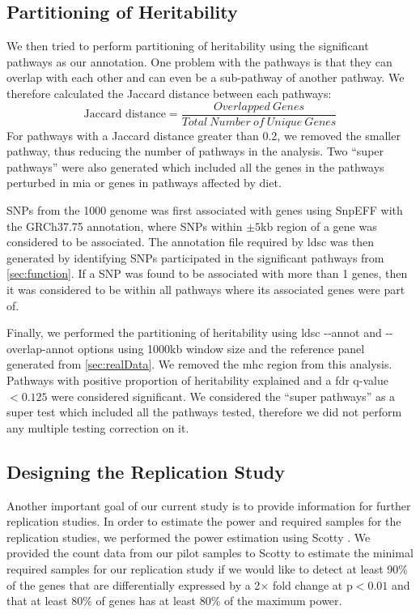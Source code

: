 \documentclass[12pt]{scrbook}
\begin{document}
\subsection{Partitioning of Heritability}
We then tried to perform partitioning of heritability using the significant pathways as our annotation.
One problem with the pathways is that they can overlap with each other and can even be a sub-pathway of another pathway.
We therefore calculated the Jaccard distance between each pathways:
\begin{equation}
\text{Jaccard distance} = \frac{Overlapped\ Genes}{Total\ Number\ of\ Unique\ Genes}
\end{equation}
For pathways with a Jaccard distance greater than 0.2, we removed the smaller pathway, thus reducing the number of pathways in the analysis.
Two ``super pathways'' were also generated which included all the genes in the pathways perturbed in \gls{mia} or genes in pathways affected by diet. 

\glspl{SNP} from the 1000 genome was first associated with genes using SnpEFF \citep{Cingolani2012} with the GRCh37.75 annotation, where \glspl{SNP} within $\pm5$\gls{kb} region of a gene was considered to be associated.
The annotation file required by \gls{ldsc} was then generated by identifying \glspl{SNP} participated in the significant pathways from \cref{sec:function}.
If a \gls{SNP} was found to be associated with more than 1 genes, then it was considered to be within all pathways where its associated genes were part of. 

Finally, we performed the partitioning of heritability using \gls{ldsc} \citep{Bulik-Sullivan2015} -{}-annot and -{}-overlap-annot options using 1000\gls{kb} window size and the reference panel generated from \cref{sec:realData}.
We removed the \gls{mhc} region from this analysis.
Pathways with positive proportion of heritability explained and a \gls{fdr} q-value $<0.125$ were considered significant.
We considered the ``super pathways'' as a super test which included all the pathways tested, therefore we did not perform any multiple testing correction on it.

\subsection{Designing the Replication Study}
Another important goal of our current study is to provide information for further replication studies. 
In order to estimate the power and required samples for the replication studies, we performed the power estimation using Scotty \citep{Busby2013}.
We provided the count data from our pilot samples to Scotty to estimate the minimal required samples for our replication study if we would like to detect at least 90\% of the genes that are differentially expressed by a 2$\times$ fold change at p$<0.01$ and that at least 80\% of genes has at least 80\% of the maximum power.
\end{document}
